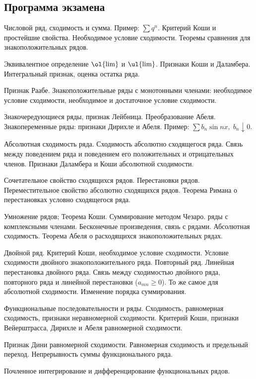 \documentclass[a4paper]{article}
\begin{document}
\subsection{Программа экзамена}

\begin{nums}{-2}
\item Числовой ряд, сходимость и сумма. Пример: $\sum q^n$. Критерий Коши и простейшие свойства. Необходимое
условие сходимости. Теоремы сравнения для знакоположительных рядов.
\item Эквивалентное определение $\ol{\lim}$ и $\ul{\lim}$. Признаки Коши и Даламбера.  Интегральный
признак, оценка остатка ряда.
\item Признак Раабе. Знакоположительные ряды с монотонными членами: необходимое условие сходимости,
необходимое и достаточное условие сходимости.
\item Знакочередующиеся ряды, признак Лейбница. Преобразование Абеля. Знакопеременные ряды: признаки Дирихле
и Абеля. Пример: $\sum b_n \sin nx, \; b_n \downarrow 0$.
\item Абсолютная сходимость ряда. Сходимость абсолютно сходящегося ряда. Связь между поведением ряда и поведением его
положительных и отрицательных членов. Признаки Даламбера и Коши абсолютной сходимости.
\item Сочетательное свойство сходящихся рядов. Перестановки рядов. Переместительное свойство абсолютно
сходящихся рядов. Теорема
Римана о перестановках условно сходящегося ряда.
\item Умножение рядов; Теорема Коши. Суммирование методом Чезаро. ряды с комплексными членами.
Бесконечные произведения, связь
с рядами. Абсолютная сходимость. Теорема Абеля о расходящихся знакоположительных рядах.
\item Двойной ряд. Критерий Коши, необходимое условие сходимости. Условие сходимости двойного знакоположительного ряда.
Повторный ряд. Линейная перестановка двойного ряда. Связь между сходимостью двойного ряда, повторного ряда и линейной
перестановки ($a_{mn} \ge 0$). То же самое для абсолютной сходимости. Изменение порядка суммирования.
\item Функциональные последовательности и ряды. Сходимость, равномерная сходимость, признаки неравномерной сходимости.
Критерий Коши, признаки Вейерштрасса, Дирихле и Абеля равномерной сходимости.
\item Признак Дини равномерной сходимости. Равномерная сходимость и предельный переход.  Непрерывность суммы
функционального ряда.
\item Почленное интегрирование и дифференцирование функциональных рядов.

\end{nums}
\end{document}
